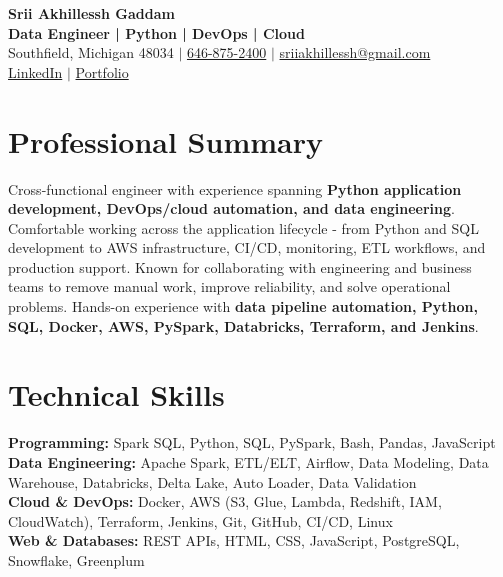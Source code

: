 \documentclass[letterpaper,10pt]{article}
\begin{document}
\fontsize{9.35pt}{10.45pt}\selectfont

\begin{center}
    {\LARGE \textbf{Srii Akhillessh Gaddam}} \\[-1pt]
    \textbf{Data Engineer | Python | DevOps | Cloud} \\[2pt]
    Southfield, Michigan 48034 $|$
    \href{tel:6468752400}{646-875-2400} $|$
    \href{mailto:sriiakhillessh@gmail.com}{sriiakhillessh@gmail.com} \\[1pt]
    \href{https://www.linkedin.com/in/srii-akhiilessh-gaddam-b48668191/}{LinkedIn} $|$
    \href{https://sriiakhillesshg.github.io/portfolio/}{Portfolio}
\end{center}
\vspace{-8pt}

\section{Professional Summary}
\small{Cross-functional engineer with experience spanning \textbf{Python application development, DevOps/cloud automation, and data engineering}. Comfortable working across the application lifecycle - from Python and SQL development to AWS infrastructure, CI/CD, monitoring, ETL workflows, and production support. Known for collaborating with engineering and business teams to remove manual work, improve reliability, and solve operational problems. Hands-on experience with \textbf{data pipeline automation, Python, SQL, Docker, AWS, PySpark, Databricks, Terraform, and Jenkins}.}

\section{Technical Skills}
\small{
\textbf{Programming:} Spark SQL, Python, SQL, PySpark, Bash, Pandas, JavaScript \\
\textbf{Data Engineering:} Apache Spark, ETL/ELT, Airflow, Data Modeling, Data Warehouse, Databricks, Delta Lake, Auto Loader, Data Validation \\
\textbf{Cloud \& DevOps:} Docker, AWS (S3, Glue, Lambda, Redshift, IAM, CloudWatch), Terraform, Jenkins, Git, GitHub, CI/CD, Linux \\
\textbf{Web \& Databases:} REST APIs, HTML, CSS, JavaScript, PostgreSQL, Snowflake, Greenplum
}
\end{document}
